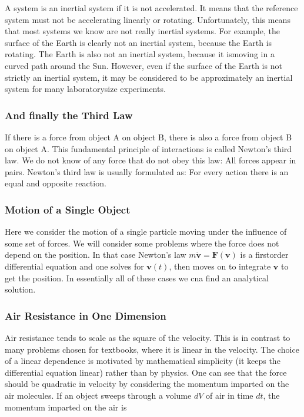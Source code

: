 \documentclass[letterpaper,10pt,english]{sphinxmanual}
\begin{document}
A system is an inertial system if it is not accelerated. It means that the reference system
must not be accelerating linearly or rotating. Unfortunately, this means that most
systems we know are not really inertial systems. For example, the surface of the
Earth is clearly not an inertial system, because the Earth is rotating. The Earth is also
not an inertial system, because it ismoving in a curved path around the Sun. However,
even if the surface of the Earth is not strictly an inertial system, it may be considered
to be approximately an inertial system for many laboratory\sphinxhyphen{}size experiments.


\subsubsection{And finally the Third Law}
\label{\detokenize{chapter3:and-finally-the-third-law}}
If there is a force from object A on object B, there is also a force from object B on object A.
This fundamental principle of interactions is called Newton’s third law. We do not
know of any force that do not obey this law: All forces appear in pairs. Newton’s
third law is usually formulated as: For every action there is an equal and opposite
reaction.


\subsubsection{Motion of a Single Object}
\label{\detokenize{chapter3:motion-of-a-single-object}}
Here we consider the motion of a single particle moving under
the influence of some set of forces.  We will consider some problems where
the force does not depend on the position. In that case Newton’s law
\(m\dot{\boldsymbol{v}}=\boldsymbol{F}(\boldsymbol{v})\) is a first\sphinxhyphen{}order differential
equation and one solves for \(\boldsymbol{v}(t)\), then moves on to integrate
\(\boldsymbol{v}\) to get the position. In essentially all of these cases we cna find an analytical solution.


\subsubsection{Air Resistance in One Dimension}
\label{\detokenize{chapter3:air-resistance-in-one-dimension}}
Air resistance tends to scale as the square of the velocity. This is
in contrast to many problems chosen for textbooks, where it is linear
in the velocity. The choice of a linear dependence is motivated by
mathematical simplicity (it keeps the differential equation linear)
rather than by physics. One can see that the force should be quadratic
in velocity by considering the momentum imparted on the air
molecules. If an object sweeps through a volume \(dV\) of air in time
\(dt\), the momentum imparted on the air is
\end{document}
